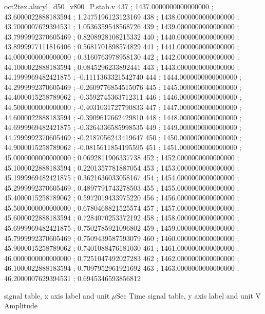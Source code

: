 \begin{filecontents}[overwrite]{oct2tex.alucyl_d50_v800_P.stab.v}
437 ; 1437.0000000000000000 ; 43.6000022888183594 ; 1.2475196123123169
438 ; 1438.0000000000000000 ; 43.7000007629394531 ; 1.0536359548568726
439 ; 1439.0000000000000000 ; 43.7999992370605469 ; 0.8208928108215332
440 ; 1440.0000000000000000 ; 43.8999977111816406 ; 0.5681701898574829
441 ; 1441.0000000000000000 ; 44.0000000000000000 ; 0.3160763978958130
442 ; 1442.0000000000000000 ; 44.1000022888183594 ; 0.0845296233892441
443 ; 1443.0000000000000000 ; 44.1999969482421875 ; -0.1111363321542740
444 ; 1444.0000000000000000 ; 44.2999992370605469 ; -0.2609776854515076
445 ; 1445.0000000000000000 ; 44.4000015258789062 ; -0.3592745363712311
446 ; 1446.0000000000000000 ; 44.5000000000000000 ; -0.4031031727790833
447 ; 1447.0000000000000000 ; 44.6000022888183594 ; -0.3909617662429810
448 ; 1448.0000000000000000 ; 44.6999969482421875 ; -0.3264336585998535
449 ; 1449.0000000000000000 ; 44.7999992370605469 ; -0.2187056243419647
450 ; 1450.0000000000000000 ; 44.9000015258789062 ; -0.0815611854195595
451 ; 1451.0000000000000000 ; 45.0000000000000000 ; 0.0692811906337738
452 ; 1452.0000000000000000 ; 45.1000022888183594 ; 0.2201357781887054
453 ; 1453.0000000000000000 ; 45.1999969482421875 ; 0.3621636033058167
454 ; 1454.0000000000000000 ; 45.2999992370605469 ; 0.4897791743278503
455 ; 1455.0000000000000000 ; 45.4000015258789062 ; 0.5972019433975220
456 ; 1456.0000000000000000 ; 45.5000000000000000 ; 0.6780468821525574
457 ; 1457.0000000000000000 ; 45.6000022888183594 ; 0.7284070253372192
458 ; 1458.0000000000000000 ; 45.6999969482421875 ; 0.7502785921096802
459 ; 1459.0000000000000000 ; 45.7999992370605469 ; 0.7509439587593079
460 ; 1460.0000000000000000 ; 45.9000015258789062 ; 0.7401088476181030
461 ; 1461.0000000000000000 ; 46.0000000000000000 ; 0.7251047492027283
462 ; 1462.0000000000000000 ; 46.1000022888183594 ; 0.7097952961921692
463 ; 1463.0000000000000000 ; 46.2000007629394531 ; 0.6945346593856812
\end{filecontents}
\expandafter\def\csname oct2tex.alucyl_d50_v800_P.stabxlbl.d\endcsname{signal table, x axis label and unit}
\expandafter\def\csname oct2tex.alucyl_d50_v800_P.stabxlbl.u\endcsname{\ensuremath{\mu\text{Sec}}}
\expandafter\def\csname oct2tex.alucyl_d50_v800_P.stabxlbl.v\endcsname{Time}
\expandafter\def\csname oct2tex.alucyl_d50_v800_P.stabylbl.d\endcsname{signal table, y axis label and unit}
\expandafter\def\csname oct2tex.alucyl_d50_v800_P.stabylbl.u\endcsname{\ensuremath{\text{V}}}
\expandafter\def\csname oct2tex.alucyl_d50_v800_P.stabylbl.v\endcsname{Amplitude}
